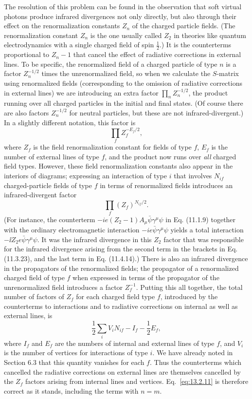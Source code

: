 The resolution of this problem can be found in the observation that soft
virtual photons produce infrared divergences not only directly, but also
through their effect on the renormalization constants $Z_n$ of the charged
particle fields. (The renormalization constant $Z_n$ is the one usually called
$Z_2$ in theories like quantum electrodynamics with a single charged field
of spin $\tfrac12$.) It is the counterterms proportional to $Z_n-1$ that cancel
the effect of radiative corrections in external lines. To be specific, the
renormalized field of a charged particle of type $n$ is a factor $Z_n^{-1/2}$
times the unrenormalized field, so when we calculate the $S$-matrix using
renormalized fields (corresponding to the omission of radiative corrections
in external lines) we are introducing an extra factor $\prod_n Z_n^{-1/2}$, the product
running over all charged particles in the initial and final states. (Of
course there are also factors $Z_n^{-1/2}$ for neutral particles, but these are not
infrared-divergent.) In a slightly different notation, this factor is
\[
  \prod_f Z_f^{-E_f/2},
\]
where $Z_f$ is the field renormalization constant for fields of type $f$, $E_f$ is
the number of external lines of type $f$, and the product now runs over \emph{all}
charged field types. However, these field renormalization constants also
appear in the interiors of diagrams; expressing an interaction of type $i$
that involves $N_{if}$ charged-particle fields of type $f$ in terms of renormalized
fields introduces an infrared-divergent factor
\[
  \prod_f(Z_f)^{N_{if}/2}.
\]
(For instance, the counterterm $-ie(Z_2-1)A_\mu\bar\psi\gamma^\mu\psi$ in Eq. (11.1.9) together
with the ordinary electromagnetic interaction $-ie\bar\psi\gamma^\mu\psi$ yields a total
interaction $-\ii Z_2e\bar\psi\gamma^\mu\psi$. It was the infrared divergence in this $Z_2$ factor that
was responsible for the infrared divergence arising from the second term
in the brackets in Eq. (11.3.23), and the last term in Eq. (11.4.14).) There is
also an infrared divergence in the propagators of the renormalized fields;
the propagator of a renormalized charged field of type $f$ when expressed
in terms of the propagator of the unrenormalized field introduces a factor
$Z_f^{-1}$. Putting this all together, the total number of factors of $Z_f$ for each
charged field type $f$, introduced by the counterterms to interactions and
to radiative corrections on internal as well as external lines, is
\[
  \frac12\sum_i V_iN_{if}-I_f-\frac12E_f,
\]
where $I_f$ and $E_f$ are the numbers of internal and external lines of type
$f$, and $V_i$ is the number of vertices for interactions of type $i$. We have
already noted in Section 6.3 that this quantity vanishes for each $f$. Thus
the counterterms which cancelled the radiative corrections on external
lines are themselves cancelled by the $Z_f$ factors arising from internal lines
and vertices. Eq.~\eqref{eq:13.2.11} is therefore correct as it stands, including the
terms with $n=m$.
